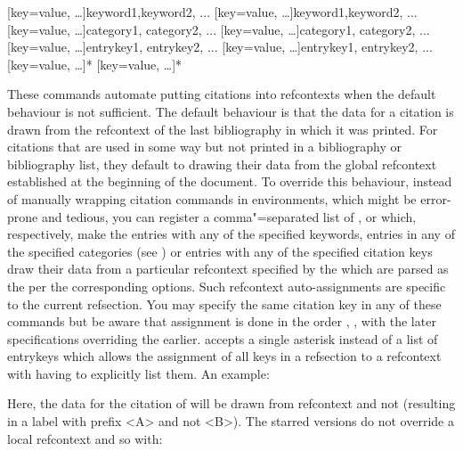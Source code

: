 \begin{ltxsyntax}

[key=value, \dots]{keyword1,keyword2, ...}
[key=value, \dots]{keyword1,keyword2, ...}
[key=value, \dots]{category1, category2, ...}
[key=value, \dots]{category1, category2, ...}
[key=value, \dots]{entrykey1, entrykey2, ...}
[key=value, \dots]{entrykey1, entrykey2, ...}
[key=value, \dots]{*}
[key=value, \dots]{*}

\end{ltxsyntax}
These commands automate putting citations into refcontexts when the default behaviour is not sufficient. The default behaviour is that the data for a citation is drawn from the refcontext of the last bibliography in which it was printed. For citations that are used in some way but not printed in a bibliography or bibliography list, they default to drawing their data from the global refcontext established at the beginning of the document. To override this behaviour, instead of manually wrapping citation commands in  environments, which might be error-prone and tedious, you can register a comma"=separated list of ,  or  which, respectively, make the entries with any of the specified keywords, entries in any of the specified categories (see ) or entries with any of the specified citation keys draw their data from a particular refcontext specified by the  which are parsed as the per the corresponding  options. Such refcontext auto-assignments are specific to the current refsection. You may specify the same citation key in any of these commands but be aware that assignment is done in the order , ,  with the later specifications overriding the earlier.  accepts a single asterisk instead of a list of entrykeys which allows the assignment of all keys in a refsection to a refcontext with having to explicitly list them. An example:

\begin{ltxexample}[style=latex]{}
\cite{key1}
\begin{refcontext}[labelprefix=B]
\cite{key2}
\end{refcontext}
\end{ltxexample}
%
Here, the data for the citation of  will be drawn from refcontext  and not  (resulting in a label with prefix <A> and not <B>).
The starred versions do not override a local refcontext and so with:

